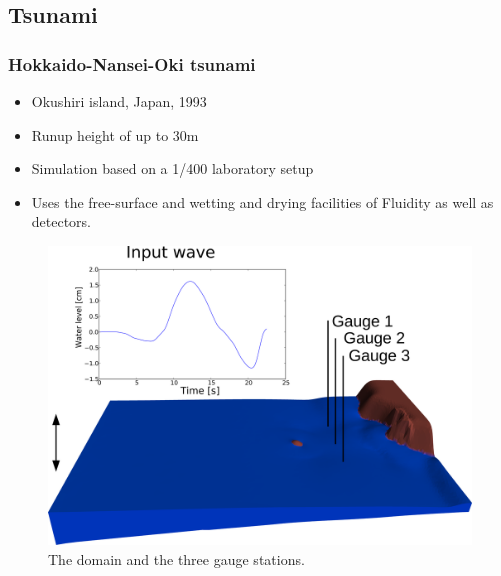 \subsection{Tsunami}

\begin{frame}
    \frametitle{Hokkaido-Nansei-Oki tsunami}
\begin{minipage}[]{0.5\linewidth} 
\begin{itemize}
\item Okushiri island, Japan, 1993 
\item Runup height of up to 30m
\item Simulation based on a 1/400 laboratory setup 
\item Uses the free-surface and wetting and drying facilities of Fluidity as well as detectors.
\end{itemize}
\end{minipage}
\hspace{0.5cm}
\begin{minipage}[]{0.4\linewidth} 
\begin{figure}
\begin{center}
\includegraphics[width=\textwidth]{hokkaido-nansei-oki_tsunami/MonaiValleyDomainWithInputWave2_png.pdf}
\end{center}
\caption{The domain and the three gauge stations.}\label{fig:monai_inputwave}
\end{figure}
\end{minipage}
\end{frame}

